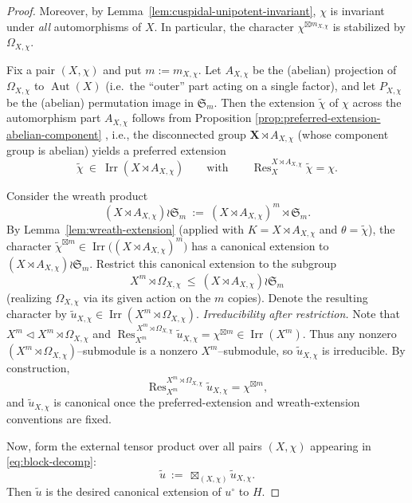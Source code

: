 \documentclass{amsart}
\theoremstyle{plain}
\numberwithin{equation}{section}
\theoremstyle{definition}
\newcommand{\Res}{\operatorname{Res}}
\newcommand{\Irr}{\operatorname{Irr}}
\newcommand{\Aut}{\operatorname{Aut}}
\begin{document}
\begin{proof}
Moreover, by Lemma~\ref{lem:cuspidal-unipotent-invariant}, $\chi$ is invariant under \emph{all}
automorphisms of $X$.  In particular, the character $\chi^{\boxtimes m_{X,\chi}}$ is stabilized by
$\Omega_{X,\chi}$.

\medskip
Fix a pair $(X,\chi)$ and put $m:=m_{X,\chi}$.
Let $A_{X,\chi}$ be the (abelian) projection of $\Omega_{X,\chi}$ to $\Aut(X)$ (i.e.\ the ``outer''
part acting on a single factor), and let $P_{X,\chi}$ be the (abelian) permutation image in
$\mathfrak S_m$.
Then the extension \(\widetilde{\chi}\) of \(\chi\) across the automorphism part $A_{X,\chi}$ follows from Proposition \ref{prop:preferred-extension-abelian-component} , i.e.,  the disconnected group $\mathbf X\rtimes A_{X,\chi}$ (whose component group is
abelian) yields a preferred extension
\[
\widetilde\chi\ \in\ \Irr(X\rtimes A_{X,\chi})
\qquad\text{with}\qquad
\Res^{X\rtimes A_{X,\chi}}_{X}\widetilde\chi=\chi.
\]

\smallskip

Consider the wreath product
\[
(X\rtimes A_{X,\chi})\wr \mathfrak S_m \ :=\ (X\rtimes A_{X,\chi})^m \rtimes \mathfrak S_m.
\]
By Lemma~\ref{lem:wreath-extension} (applied with $K=X\rtimes A_{X,\chi}$ and $\theta=\widetilde\chi$),
the character $\widetilde\chi^{\boxtimes m}\in\Irr\bigl((X\rtimes A_{X,\chi})^m\bigr)$ has a
canonical extension to $(X\rtimes A_{X,\chi})\wr\mathfrak S_m$.
Restrict this canonical extension to the subgroup
\[
X^m \rtimes \Omega_{X,\chi}\ \le\ (X\rtimes A_{X,\chi})\wr\mathfrak S_m
\]
(realizing $\Omega_{X,\chi}$ via its given action on the $m$ copies).  Denote the resulting
character by $\widetilde u_{X,\chi}\in\Irr(X^m\rtimes \Omega_{X,\chi})$.
\medskip
\noindent\textit{Irreducibility after restriction.}
Note that $X^m\triangleleft X^m\rtimes\Omega_{X,\chi}$ and $\Res^{\,X^m\rtimes\Omega_{X,\chi}}_{X^m}\tilde u_{X,\chi}=\chi^{\boxtimes m}\in\Irr(X^m)$. Thus any nonzero $(X^m\rtimes\Omega_{X,\chi})$--submodule is a nonzero $X^m$--submodule, so $\tilde u_{X,\chi}$ is irreducible.
By construction,
\[
\Res^{X^m\rtimes \Omega_{X,\chi}}_{X^m}\widetilde u_{X,\chi}=\chi^{\boxtimes m},
\]
and $\widetilde u_{X,\chi}$ is canonical once the preferred-extension and wreath-extension
conventions are fixed.

\medskip

Now, form the external tensor product over all pairs $(X,\chi)$ appearing in \eqref{eq:block-decomp}:
\[
\widetilde u \ :=\ \boxtimes_{(X,\chi)} \widetilde u_{X,\chi}.
\]
Then $\widetilde u$ is the desired canonical extension of $u^\circ$ to $H$.

\end{proof}
\end{document}

